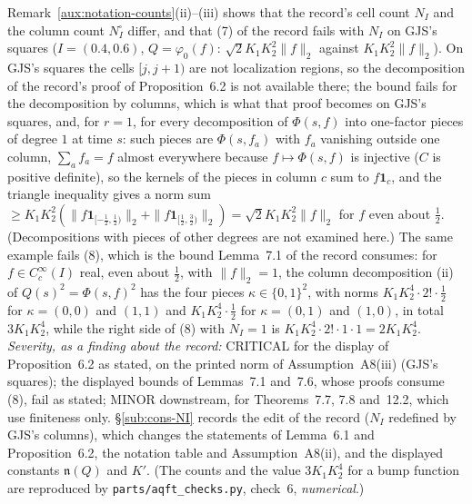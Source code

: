 \begin{auxrem}\label{aux:d3-cells}
Remark~\ref{aux:notation-counts}(ii)--(iii) shows that the record's cell count $N_I$ and the
column count $N^\square_I$ differ, and that (7) of the record fails with $N_I$ on GJS's squares
($I=(0.4,0.6)$, $Q=\varphi_0(f)$: $\sqrt2K_1K_2^2\|f\|_2$ against $K_1K_2^2\|f\|_2$).  On GJS's
squares the cells $[j,j+1)$ are not localization regions, so the decomposition of the record's
proof of Proposition~6.2 is not available there; the bound fails for the decomposition by columns,
which is what that proof becomes on GJS's squares, and, for $r=1$, for every decomposition of
$\Phi(s,f)$ into one-factor pieces of degree $1$ at time $s$: such pieces are $\Phi(s,f_a)$ with
$f_a$ vanishing outside one column, $\sum_af_a=f$ almost everywhere because $f\mapsto\Phi(s,f)$ is
injective ($C$ is positive definite), so the kernels of the pieces in column $c$ sum to
$f\mathbf 1_c$, and the triangle inequality gives a norm sum
$\ge K_1K_2^2(\|f\mathbf 1_{[-\frac12,\frac12)}\|_2+\|f\mathbf 1_{[\frac12,\frac32)}\|_2)
=\sqrt2K_1K_2^2\|f\|_2$ for $f$ even about $\frac12$.  (Decompositions with pieces of other
degrees are not examined here.)  The same example fails (8), which is the bound Lemma~7.1 of the
record consumes: for $f\in C_c^\infty(I)$ real, even about $\frac12$, with $\|f\|_2=1$, the column
decomposition (ii) of $Q(s)^2=\Phi(s,f)^2$ has the four pieces $\kappa\in\{0,1\}^2$, with norms
$K_1K_2^4\cdot2!\cdot\frac12$ for $\kappa=(0,0)$ and $(1,1)$ and $K_1K_2^4\cdot\frac12$ for
$\kappa=(0,1)$ and $(1,0)$, in total $3K_1K_2^4$, while the right side of (8) with $N_I=1$ is
$K_1K_2^4\cdot2!\cdot1\cdot1=2K_1K_2^4$.  \emph{Severity, as a finding about the record:}
CRITICAL for the display of Proposition~6.2 as stated, on the printed norm of Assumption~A8(iii)
(GJS's squares); the displayed bounds of Lemmas~7.1 and~7.6, whose proofs consume (8), fail as
stated; MINOR downstream, for Theorems~7.7, 7.8 and~12.2, which use finiteness only.
\S\ref{sub:cons-NI} records the edit of the record ($N_I$ redefined by GJS's columns), which
changes the statements of Lemma~6.1 and Proposition~6.2, the notation table and Assumption~A8(ii),
and the displayed constants $\mathfrak n(Q)$ and $K'$.  (The counts and the value $3K_1K_2^4$ for a
bump function are reproduced by \texttt{parts/aqft\_checks.py}, check~6, \emph{numerical}.)
\end{auxrem}

